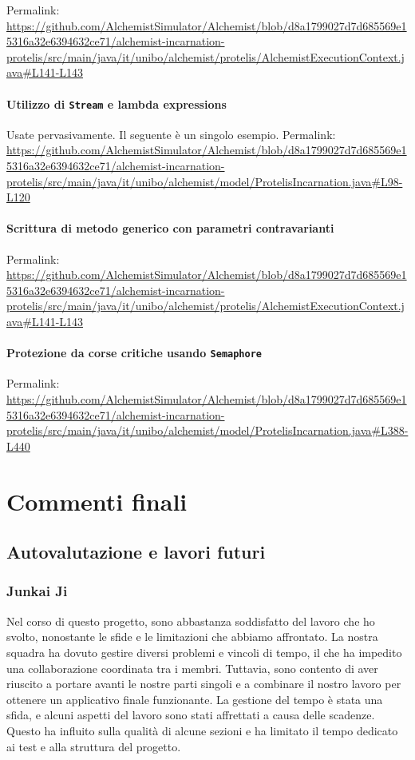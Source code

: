 \documentclass[a4paper,12pt]{report}
\begin{document}
	Permalink: \url{https://github.com/AlchemistSimulator/Alchemist/blob/d8a1799027d7d685569e15316a32e6394632ce71/alchemist-incarnation-protelis/src/main/java/it/unibo/alchemist/protelis/AlchemistExecutionContext.java#L141-L143}
	
	\subsubsection{Utilizzo di \texttt{Stream} e lambda expressions}
	
	Usate pervasivamente. Il seguente è un singolo esempio.
	Permalink: \url{https://github.com/AlchemistSimulator/Alchemist/blob/d8a1799027d7d685569e15316a32e6394632ce71/alchemist-incarnation-protelis/src/main/java/it/unibo/alchemist/model/ProtelisIncarnation.java#L98-L120}
	
	\subsubsection{Scrittura di metodo generico con parametri contravarianti}
	
	Permalink: \url{https://github.com/AlchemistSimulator/Alchemist/blob/d8a1799027d7d685569e15316a32e6394632ce71/alchemist-incarnation-protelis/src/main/java/it/unibo/alchemist/protelis/AlchemistExecutionContext.java#L141-L143}
	
	\subsubsection{Protezione da corse critiche usando \texttt{Semaphore}}
	
	Permalink: \url{https://github.com/AlchemistSimulator/Alchemist/blob/d8a1799027d7d685569e15316a32e6394632ce71/alchemist-incarnation-protelis/src/main/java/it/unibo/alchemist/model/ProtelisIncarnation.java#L388-L440}
	
	
	\chapter{Commenti finali}

\section{Autovalutazione e lavori futuri}

\subsection{Junkai Ji}
Nel corso di questo progetto, sono abbastanza soddisfatto del lavoro che ho svolto, nonostante le sfide e le limitazioni che abbiamo affrontato. La nostra squadra ha dovuto gestire diversi problemi e vincoli di tempo, il che ha impedito una collaborazione coordinata tra i membri. Tuttavia, sono contento di aver riuscito a portare avanti le nostre parti singoli e a combinare il nostro lavoro per ottenere un applicativo finale funzionante. La gestione del tempo è stata una sfida, e alcuni aspetti del lavoro sono stati affrettati a causa delle scadenze. Questo ha influito sulla qualità di alcune sezioni e ha limitato il tempo dedicato ai test e alla struttura del progetto.
\end{document}
